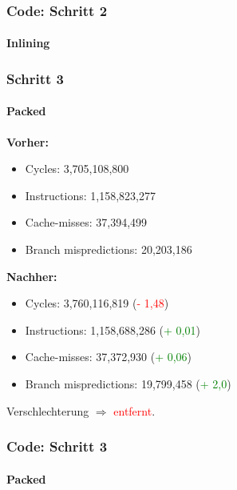 \documentclass{beamer}
\newcommand{\success}[1]{\textcolor{green}{#1}}
\newcommand{\fail}[1]{\textcolor{red}{#1}}
\begin{document}
    \begin{frame}
  	\frametitle{Code: Schritt 2}
		\framesubtitle{Inlining}
		\sInlining	
  \end{frame}
  
  
  \begin{frame}
  	\frametitle{Schritt 3}
  	\framesubtitle{Packed}
  	\textbf{Vorher:}
  	\begin{itemize}
			\item Cycles: 3,705,108,800 \\
			\item Instructions: 1,158,823,277\\
			\item Cache-misses: 37,394,499\\
			\item Branch mispredictions: 20,203,186\\
		\end{itemize}	
		
		\textbf{Nachher:}
		\begin{itemize}
			\item Cycles: 3,760,116,819 (\fail{- 1,48})\\
			\item Instructions: 1,158,688,286 (\success{+ 0,01})\\
			\item Cache-misses: 37,372,930 (\success{+ 0,06})\\
			\item Branch mispredictions: 19,799,458 (\success{+ 2,0})\\
		\end{itemize}	
		Verschlechterung $\Rightarrow$ \fail{entfernt}.
  \end{frame}
  
    \begin{frame}
  	\frametitle{Code: Schritt 3}
  	\framesubtitle{Packed}
		\sPacked
  \end{frame}
    
\end{document}
